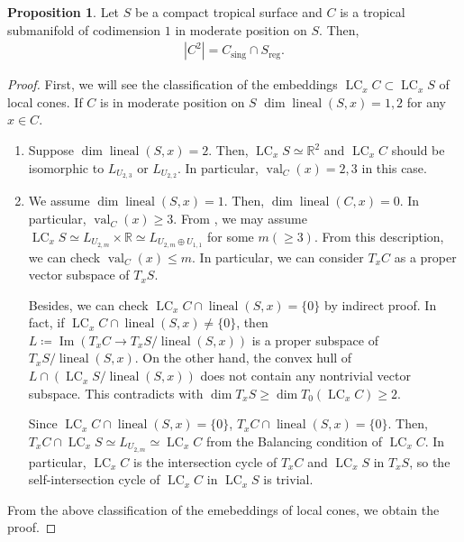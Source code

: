 \documentclass[a4paper,dvipdfmx,reqno,12pt]{amsart}
\theoremstyle{definition}
\newtheorem{proposition}[theorem]{Proposition}
\newcommand{\deq}{\coloneqq}
\newcommand{\opn}[1]{\operatorname{#1}}
\numberwithin{equation}{section}
\begin{document}
\begin{proposition}
\label{proposition-self-intersection}
Let $S$ be a compact tropical surface
and $C$ is a tropical submanifold of codimension $1$
in moderate position on $S$. Then, 
\begin{align}
     |C^2|= C_{\mathrm{sing}}\cap S_{\mathrm{reg}}.
\end{align} 
\end{proposition}
\begin{proof}
First, we will see the classification of
the embeddings
$\opn{LC}_x C \subset \opn{LC}_x S$ of local cones.
If $C$ is in moderate position on $S$
$\dim \opn{lineal}(S,x)=1,2$ for any $x\in C$.
\begin{enumerate}[align=left,leftmargin=*]
\item Suppose $\dim \opn{lineal}(S,x)=2$.
Then, $\opn{LC}_x S\simeq \mathbb{R}^2$ and
$\opn{LC}_x C$ should be isomorphic to 
$L_{U_{2,3}}$ or $L_{U_{2,2}}$. 
In particular, $\opn{val}_C(x)=2,3$ in this case.
\item We assume $\dim \opn{lineal}(S,x)=1$. 
Then, $\dim \opn{lineal}(C,x)=0$.
In particular, $\opn{val}_C(x)\geq 3$.
From \cite[Corollary 2.4]{shaw2015tropical}, 
we may assume $\opn{LC}_x S\simeq L_{U_{2,m}}\times \mathbb{R}
\simeq L_{U_{2,m}\oplus U_{1,1}}$
for some $m(\geq 3)$.
From this description, we can check $\opn{val}_C(x)\leq m$.
In particular, we can consider $T_x C$ as 
a proper vector subspace of $T_x S$.



Besides, we can check 
$\opn{LC}_x C\cap \opn{lineal}(S,x)=\{0\}$
by indirect proof.
In fact, if $\opn{LC}_x C\cap \opn{lineal}(S,x)\ne \{0\}$,
then $L\deq \opn{Im} (T_x C\to T_x S/\opn{lineal}(S,x))$ is a
proper subspace of $T_x S/\opn{lineal}(S,x)$.
On the other hand,
the convex hull of 
$L\cap (\opn{LC}_x S/\opn{lineal}(S,x))$
does not contain any nontrivial vector subspace.
This contradicts with $\dim T_x S\geq \dim T_0(\opn{LC}_x C)\geq 2$.

Since $\opn{LC}_x C\cap \opn{lineal}(S,x)=\{0\}$,
$T_x C\cap \opn{lineal}(S,x)=\{0\}$. Then,
$T_x C\cap \opn{LC}_x S\simeq L_{U_{2,m}}\simeq \opn{LC}_x C$
from the Balancing condition of $\opn{LC}_x C$.
In particular, $\opn{LC}_x C$ is the intersection cycle of
$T_x C$ and $\opn{LC}_x S$ in $T_x S$, so the self-intersection cycle
of $\opn{LC}_x C$ in $\opn{LC}_x S$ is trivial.
\end{enumerate}
From the above classification of the emebeddings
of local cones, we obtain the proof. 

\end{proof}
\end{document}

